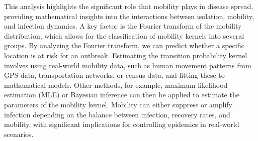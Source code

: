 \documentclass[sn-basic]{sn-jnl}%
\theoremstyle{thmstyleone}%
\theoremstyle{thmstyletwo}%
\theoremstyle{thmstylethree}%
\numberwithin{equation}{theorem}
\begin{document}
\begin{table}[ht]
\caption{Denote $\theta = \kappa \hat{a}(k) + \beta - \gamma$, $\alpha = \kappa \hat{a}(k)$. $R_0=\frac{\beta}{\gamma}$. $R_0^m=\frac{\kappa\hat{a}(k)+\beta}{\gamma}$. Asymptotic Behavior of $m_1^I(t,x)$ in Homogeneous and Inhomogeneous Space.}
\label{tab:first_moment_asymptotic_horizontal_compact}
\end{table}


This analysis highlights the significant role that mobility plays in disease spread, providing mathematical insights into the interactions between isolation, mobility, and infection dynamics. A key factor is the Fourier transform of the mobility distribution, which allows for the classification of mobility kernels into several groups. By analyzing the Fourier transform, we can predict whether a specific location is at risk for an outbreak. Estimating the transition probability kernel involves using real-world mobility data, such as human movement patterns from GPS data, transportation networks, or census data, and fitting these to mathematical models. Other methods, for example, maximum likelihood estimation (MLE) or Bayesian inference can then be applied to estimate the parameters of the mobility kernel. Mobility can either suppress or amplify infection depending on the balance between infection, recovery rates, and mobility, with significant implications for controlling epidemics in real-world scenarios.
\end{document}
